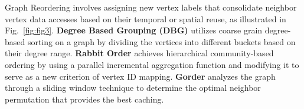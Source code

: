 \documentclass[conference]{IEEEtran}
\begin{document}
\label{Background:Graph}
Graph Reordering \cite{petit_experiments_2004,boldi_webgraph_2003,barik_vertex_2020,frasca_numa-aware_2012,karypis_fast_1998,karantasis_parallelization_2014,cuthill_reducing_1969,wei_speedup_2016,broder_resemblance_1997, chierichetti_compressing_2009, lasalle_multi-threaded_2013, george_nested_1973,arai_rabbit_2016} involves assigning new vertex labels that consolidate neighbor vertex data accesses based on their temporal or spatial reuse, as illustrated in Fig.~\ref{fig:fig3}.
\textbf{Degree Based Grouping (DBG)} \cite{faldu_closer_2020} utilizes coarse grain degree-based sorting on a graph by dividing the vertices into different buckets based on their degree range.
\textbf{Rabbit Order} \cite{arai_rabbit_2016,balaji_when_2018} achieves hierarchical community-based ordering by using a parallel incremental aggregation function and modifying it to serve as a new criterion of vertex ID mapping.
\textbf{Gorder} \cite{willcock_accelerating_2006} analyzes the graph through a sliding window technique to determine the optimal neighbor permutation that provides the best caching. 
\end{document}
